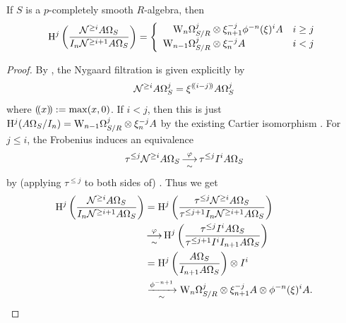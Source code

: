 \begin{proposition}
  \label{prop:h*-nyg}
  If $S$ is a $p$-completely smooth $R$-algebra, then
  \[
    \H^j\left(\frac{\Nyg^{\ge i}\AOmega_S}{I_n \Nyg^{\ge i+1}\AOmega_S}\right)
    =
    \left\{
      \begin{array}{r@{}ll}
        \dRW[n]^j_{S/R} &{}\tnsr \xi_{n+1}^{-j} \phi^{-n}(\xi)^{i}A & i\ge j\\
        \dRW[n-1]^j_{S/R} &{}\tnsr \xi_n^{-j}A & i < j
      \end{array}
    \right.
  \]
\end{proposition}
\begin{proof}
  By \cite[Remark 9.11]{BMS2}, the Nygaard filtration is given explicitly by
  \[ \Nyg^{\ge i}\AOmega^j_S = \xi^{\pos{i-j}}\AOmega^j_S \]
  where $\pos x \defeq \max(x, 0)$. If $i<j$, then this is just $\H^j(\AOmega_S/I_n)=\dRW[n-1]^j_{S/R} \tnsr \xi_n^{-j}A$ by the existing Cartier isomorphism \cite[Theorem 11.1]{BMS1}. For $j \le i$, the Frobenius induces an equivalence
  \[ \tau^{\le j} \Nyg^{\ge i} \AOmega_S \morph^\varphi_\sim \tau^{\le j} I^i A\Omega_S \]
  by (applying $\tau^{\le j}$ to both sides of) \cite[Theorem 2.16]{BouisCartier}. Thus we get
  \begin{align*}
    \H^j\left(\frac{\Nyg^{\ge i}\AOmega_S}{I_n\Nyg^{\ge i+1}\AOmega_S}\right)
    &= \H^j\left(\frac{\tau^{\le j}\Nyg^{\ge i}\AOmega_S}{\tau^{\le j+1}I_n\Nyg^{\ge i+1}\AOmega_S}\right)\\
    &\morph^\varphi_\sim \H^j\left(\frac{\tau^{\le j}I^i\AOmega_S}{\tau^{\le j+1}I^i I_{n+1}\AOmega_S}\right)\\
    &= \H^j\left(\frac{\AOmega_S}{I_{n+1}\AOmega_S}\right) \tnsr I^i\\
    &\xra[\sim]{\phi^{-{n+1}}} \dRW[n]^j_{S/R} \tnsr \xi_{n+1}^{-j}A \tnsr \phi^{-n}(\xi)^i A. \qedhere
  \end{align*}
\end{proof}

